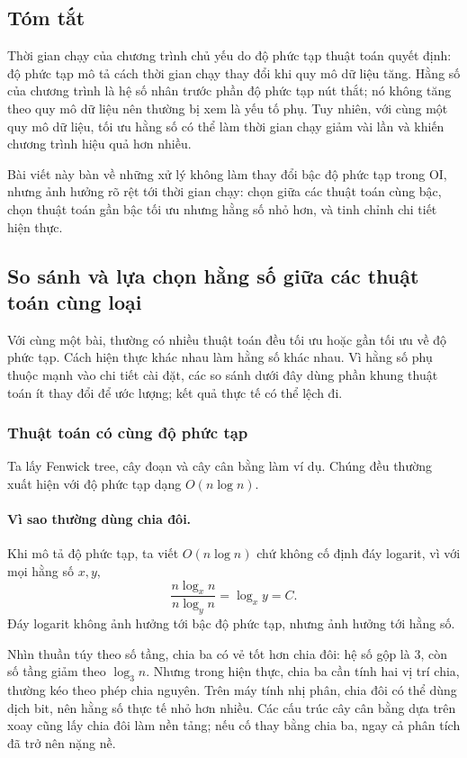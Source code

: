\documentclass[11pt]{article}
\begin{document}
\subsection*{Tóm tắt}

Thời gian chạy của chương trình chủ yếu do độ phức tạp thuật toán quyết định:
độ phức tạp mô tả cách thời gian chạy thay đổi khi quy mô dữ liệu tăng. Hằng số
của chương trình là hệ số nhân trước phần độ phức tạp nút thắt; nó không tăng
theo quy mô dữ liệu nên thường bị xem là yếu tố phụ. Tuy nhiên, với cùng một
quy mô dữ liệu, tối ưu hằng số có thể làm thời gian chạy giảm vài lần và khiến
chương trình hiệu quả hơn nhiều.

Bài viết này bàn về những xử lý không làm thay đổi bậc độ phức tạp trong OI,
nhưng ảnh hưởng rõ rệt tới thời gian chạy: chọn giữa các thuật toán cùng bậc,
chọn thuật toán gần bậc tối ưu nhưng hằng số nhỏ hơn, và tinh chỉnh chi tiết
hiện thực.

\subsection{So sánh và lựa chọn hằng số giữa các thuật toán cùng loại}

Với cùng một bài, thường có nhiều thuật toán đều tối ưu hoặc gần tối ưu về độ
phức tạp. Cách hiện thực khác nhau làm hằng số khác nhau. Vì hằng số phụ thuộc
mạnh vào chi tiết cài đặt, các so sánh dưới đây dùng phần khung thuật toán ít
thay đổi để ước lượng; kết quả thực tế có thể lệch đi.

\subsubsection{Thuật toán có cùng độ phức tạp}

Ta lấy Fenwick tree, cây đoạn và cây cân bằng làm ví dụ. Chúng đều thường xuất
hiện với độ phức tạp dạng \(O(n\log n)\).

\paragraph{Vì sao thường dùng chia đôi.}
Khi mô tả độ phức tạp, ta viết \(O(n\log n)\) chứ không cố định đáy logarit, vì
với mọi hằng số \(x,y\),
\[
  \frac{n\log_x n}{n\log_y n}=\log_x y=C.
\]
Đáy logarit không ảnh hưởng tới bậc độ phức tạp, nhưng ảnh hưởng tới hằng số.

Nhìn thuần túy theo số tầng, chia ba có vẻ tốt hơn chia đôi: hệ số gộp là \(3\),
còn số tầng giảm theo \(\log_3 n\). Nhưng trong hiện thực, chia ba cần tính hai
vị trí chia, thường kéo theo phép chia nguyên. Trên máy tính nhị phân, chia đôi
có thể dùng dịch bit, nên hằng số thực tế nhỏ hơn nhiều. Các cấu trúc cây cân
bằng dựa trên xoay cũng lấy chia đôi làm nền tảng; nếu cố thay bằng chia ba,
ngay cả phân tích đã trở nên nặng nề.
\end{document}
